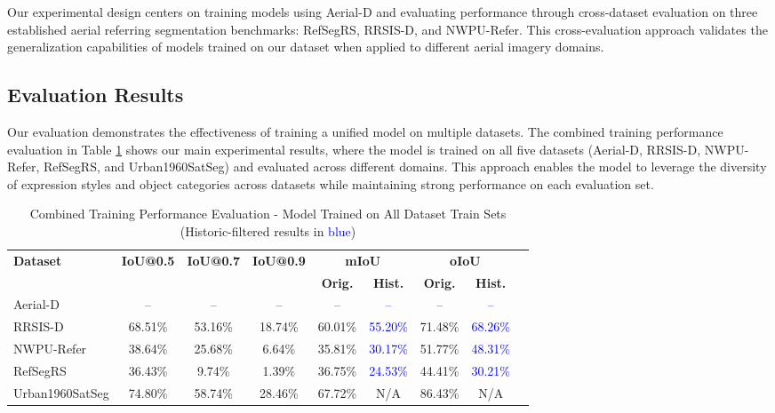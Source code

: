 Our experimental design centers on training models using Aerial-D and evaluating performance through cross-dataset evaluation on three established aerial referring segmentation benchmarks: RefSegRS, RRSIS-D, and NWPU-Refer. This cross-evaluation approach validates the generalization capabilities of models trained on our dataset when applied to different aerial imagery domains.

\subsection{Evaluation Results}
\label{subsec:evaluation_results}

Our evaluation demonstrates the effectiveness of training a unified model on multiple datasets. The combined training performance evaluation in Table \ref{tab:combined_training_results} shows our main experimental results, where the model is trained on all five datasets (Aerial-D, RRSIS-D\cite{liu2024rotated}, NWPU-Refer\cite{yang2024large}, RefSegRS\cite{yuan2023rrsis}, and Urban1960SatSeg\cite{hao2025urban1960satseg}) and evaluated across different domains. This approach enables the model to leverage the diversity of expression styles and object categories across datasets while maintaining strong performance on each evaluation set.

\begin{table}[t]
\centering
\caption{Combined Training Performance Evaluation - Model Trained on All Dataset Train Sets (Historic-filtered results in \textcolor{blue}{blue})}
\label{tab:combined_training_results}
\begin{tabular}{@{}lcccccccc@{}}
\toprule
\textbf{Dataset} & \textbf{IoU@0.5} & \textbf{IoU@0.7} & \textbf{IoU@0.9} & \multicolumn{2}{c}{\textbf{mIoU}} & \multicolumn{2}{c}{\textbf{oIoU}} \\
\cmidrule(lr){5-6} \cmidrule(lr){7-8}
 & & & & \textbf{Orig.} & \textbf{Hist.} & \textbf{Orig.} & \textbf{Hist.} \\
\midrule
Aerial-D & -- & -- & -- & -- & \textcolor{blue}{--} & -- & \textcolor{blue}{--} \\
RRSIS-D & 68.51\% & 53.16\% & 18.74\% & 60.01\% & \textcolor{blue}{55.20\%} & 71.48\% & \textcolor{blue}{68.26\%} \\
NWPU-Refer & 38.64\% & 25.68\% & 6.64\% & 35.81\% & \textcolor{blue}{30.17\%} & 51.77\% & \textcolor{blue}{48.31\%} \\
RefSegRS & 36.43\% & 9.74\% & 1.39\% & 36.75\% & \textcolor{blue}{24.53\%} & 44.41\% & \textcolor{blue}{30.21\%} \\
Urban1960SatSeg & 74.80\% & 58.74\% & 28.46\% & 67.72\% & N/A & 86.43\% & N/A \\
\bottomrule
\end{tabular}
\end{table}


